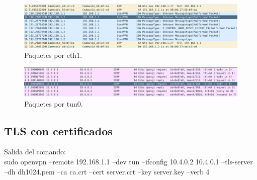 \documentclass[11pt]{article}
\begin{document}
      \begin{figure}[H]
        \centering
        \includegraphics[width = \textwidth]{pingeth1}
        \caption{Paquetes por eth1.}
        \label{figure:pingeth1}
      \end{figure}

      \begin{figure}[H]
        \centering
        \includegraphics[width = \textwidth]{pingtun0}
        \caption{Paquetes por tun0.}
        \label{figure:pingtun0}
      \end{figure}

    \subsection{TLS con certificados}
    \par
    Salida del comando:\\
    sudo openvpn --remote 192.168.1.1 --dev tun --ifconfig 10.4.0.2 10.4.0.1
    --tls-server --dh dh1024.pem --ca ca.crt --cert server.crt --key server.key
    --verb 4
\end{document}
